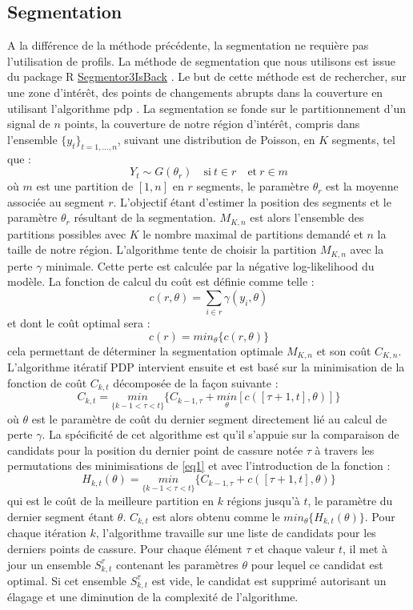 \documentclass[12pt,a4paper]{report}
\begin{document}
\begin{onehalfspace}
\section*{Segmentation}
\label{methode_segmentation}
A la différence de la méthode précédente, la segmentation ne requière pas l'utilisation de profils. La méthode de segmentation que nous utilisons est issue du package R \href{http://cran.r-project.org/web/packages/Segmentor3IsBack/index.html}{Segmentor3IsBack} \citep{Cleynen2014}. Le but de cette méthode est de rechercher, sur une zone d'intérêt, des points de changements abrupts dans la couverture en utilisant l'algorithme \gls{pdp} \citep{Rigaill2010}. La segmentation se fonde sur le partitionnement d'un signal de $n$ points, la couverture de notre région d'intérêt, compris dans l'ensemble ${\{y_t\}_{t=1,\ldots,n}}$, suivant une distribution de Poisson, en $K$ segments, tel que :
\[ Y_t \sim G(\theta_r) \quad \text{si}\ t \in r \quad \text{et}\ r \in m \]
où $m$ est une partition de $[1,n]$ en $r$ segments, le paramètre $\theta_r$ est la moyenne associée au segment $r$. L'objectif étant d'estimer la position des segments et le paramètre $\theta_r$ résultant de la segmentation. $M_{K,n}$ est alors l'ensemble des partitions possibles avec $K$ le nombre maximal de partitions demandé et $n$ la taille de notre région. L'algorithme tente de choisir la partition $M_{K,n}$ avec la perte $\gamma$ minimale. Cette perte est calculée par la négative log-likelihood du modèle. La fonction de calcul du coût est définie comme telle :
\[ c(r,\theta) = \sum_{i \in r} \gamma(y_i,\theta) \]
et dont le coût optimal sera :
\[ c(r) = min_\theta\{c(r,\theta)\} \]
cela permettant de déterminer la segmentation optimale $M_{K,n}$ et son coût $C_{K,n}$. L'algorithme itératif PDP intervient ensuite et est basé sur la minimisation de la fonction de coût $C_{k,t}$ décomposée de la façon suivante :
\begin{equation}
\label{eq1}
C_{k,t} = \underset{\{k-1<\tau<t\}}{min} \{C_{k-1,\tau} + \underset{\theta}{min}[c([\tau + 1,t],\theta)]\}
\end{equation}
où $\theta$ est le paramètre de coût du dernier segment directement lié au calcul de perte $\gamma$. La spécificité de cet algorithme est qu'il s'appuie sur la comparaison de candidats pour la position du dernier point de cassure notée $\tau$ à travers les permutations des minimisations de \eqref{eq1} et avec l'introduction de la fonction :
\[ H_{k,t}(\theta) = \underset{\{k-1<\tau<t\}}{min} \{C_{k-1,\tau} + c([\tau + 1,t],\theta)\} \]
qui est le coût de la meilleure partition en $k$ régions jusqu'à $t$, le paramètre du dernier segment étant $\theta$. $C_{k,t}$ est alors obtenu comme le $min_\theta\{H_{k,t}(\theta)\}$.
Pour chaque itération $k$, l'algorithme travaille sur une liste de candidats pour les derniers points de cassure. Pour chaque élément $\tau$ et chaque valeur $t$, il met à jour un ensemble $S_{k,t}^\tau$ contenant les paramètres $\theta$ pour lequel ce candidat est optimal. Si cet ensemble $S_{k,t}^\tau$ est vide, le candidat est supprimé autorisant un élagage et une diminution de la complexité de l'algorithme.


\end{onehalfspace}
\end{document}
